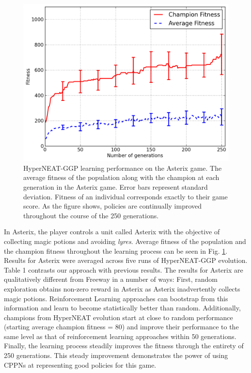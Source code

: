 \documentclass{sig-alternate}
\begin{document}
\begin{figure}[ht]
\begin{center}
\includegraphics[width=\columnwidth]{figures/asterix-results}
\end{center}
\caption{HyperNEAT-GGP learning performance on the Asterix game. The average fitness of the population along with the champion at each generation in the Asterix game. Error bars represent standard deviation. Fitness of an individual corresponds exactly to their game score. As the figure shows, policies are continually improved throughout the course of the 250 generations.}
\label{fig:asterix-curve}
\end{figure}

In Asterix, the player controls a unit called Asterix with the objective of collecting magic potions and avoiding \textit{lyres}. Average fitness of the population and the champion fitness throughout the learning process can be seen in Fig. \ref{fig:asterix-curve}. Results for Asterix were averaged across five runs of HyperNEAT-GGP evolution. Table 1 contrasts our approach with previous results. The results for Asterix are qualitatively different from Freeway in a number of ways: First, random exploration obtains non-zero reward in Asterix as Asterix inadvertently collects magic potions. Reinforcement Learning  approaches can bootstrap from this information and learn to become statistically better than random. Additionally, champions from HyperNEAT evolution start at close to random performance (starting average champion fitness = 80) and improve their performance to the same level as that of reinforcement learning approaches  within 50 generations. Finally, the learning process steadily improves the fitness through the entirety of 250 generations. This steady improvement demonstrates the power of using CPPNs at representing good policies for this game.
\end{document}
